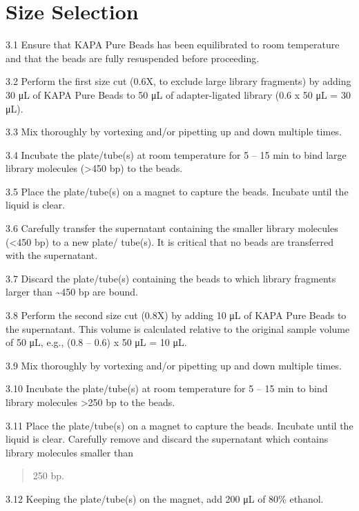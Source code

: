 \documentclass[
  letterpaper,
  DIV=11,
  numbers=noendperiod]{scrreprt}
\begin{document}
\hypertarget{size-selection}{%
\section*{\texorpdfstring{\textbf{Size
Selection}}{Size Selection}}\label{size-selection}}

3.1 Ensure that KAPA Pure Beads has been equilibrated to room
temperature and that the beads are fully resuspended before proceeding.

3.2 Perform the first size cut (0.6X, to exclude large library
fragments) by adding 30 μL of KAPA Pure Beads to 50 μL of
adapter-ligated library (0.6 x 50 μL = 30 μL).

3.3 Mix thoroughly by vortexing and/or pipetting up and down multiple
times.

3.4 Incubate the plate/tube(s) at room temperature for 5 -- 15 min to
bind large library molecules (\textgreater450 bp) to the beads.

3.5 Place the plate/tube(s) on a magnet to capture the beads. Incubate
until the liquid is clear.

3.6 Carefully transfer the supernatant containing the smaller library
molecules (\textless450 bp) to a new plate/ tube(s). It is critical that
no beads are transferred with the supernatant.

3.7 Discard the plate/tube(s) containing the beads to which library
fragments larger than \textasciitilde450 bp are bound.

3.8 Perform the second size cut (0.8X) by adding 10 μL of KAPA Pure
Beads to the supernatant. This volume is calculated relative to the
original sample volume of 50 μL, e.g., (0.8 -- 0.6) x 50 μL = 10 μL.

3.9 Mix thoroughly by vortexing and/or pipetting up and down multiple
times.

3.10 Incubate the plate/tube(s) at room temperature for 5 -- 15 min to
bind library molecules \textgreater250 bp to the beads.

3.11 Place the plate/tube(s) on a magnet to capture the beads. Incubate
until the liquid is clear. Carefully remove and discard the supernatant
which contains library molecules smaller than

\begin{quote}
250 bp.
\end{quote}

3.12 Keeping the plate/tube(s) on the magnet, add 200 μL of 80\%
ethanol.
\end{document}
